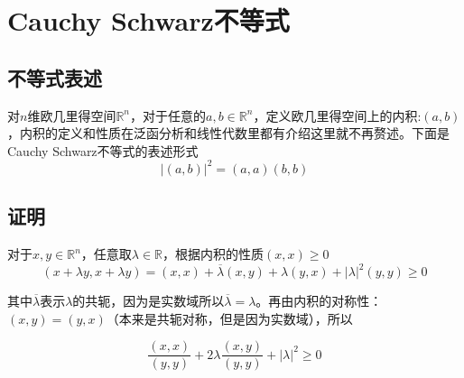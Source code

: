 \chapter{Cauchy Schwarz不等式}

\section{不等式表述}

对$n$维欧几里得空间$\mathbb{R}^n$，对于任意的$a,b\in \mathbb{R}^n$，定义欧几里得空间上的内积:$(a,b)$，内积的定义和性质在泛函分析和线性代数里都有介绍这里就不再赘述。下面是Cauchy Schwarz不等式的表述形式
$$
    |(a,b)|^2=(a,a)(b,b)
$$

\section{证明}

对于$x,y\in \mathbb{R}^n$，任意取$\lambda\in \mathbb{R}$，根据内积的性质$(x,x)\geqslant 0$
\begin{equation}
    (x+\lambda y,x+\lambda y)=(x,x)+\overline{\lambda}(x,y)+\lambda(y,x)+|\lambda|^2(y,y)\geqslant 0
\end{equation}

其中$\overline{\lambda}$表示$\lambda$的共轭，因为是实数域所以$\overline{\lambda}=\lambda$。再由内积的对称性：$(x,y)=(y,x)$（本来是共轭对称，但是因为实数域），所以

\begin{equation}
    \frac{(x,x)}{(y,y)}+2\lambda\frac{(x,y)}{(y,y)}+|\lambda|^2\geqslant 0
\end{equation}